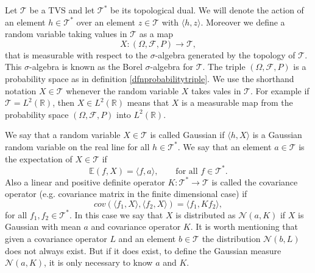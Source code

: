 \documentclass[12pt]{book}
\newcommand{\E}{\mathbb{E}} %
\newcommand{\tvs}{\mathscr{T}} %
\begin{document}
Let $\mathscr{T}$ be a TVS and  let $\mathscr{T}^{*}$ be its topological dual. 
We will denote the action of an 
element $h\in\tvs^{*}$ over an element $z\in\tvs$ with $\langle h,z\rangle$. Moreover 
we  define a random variable taking values in $\tvs$ as a map 
\begin{equation*}
X:(\Omega,\mathscr{F},P)\longrightarrow\tvs,
\end{equation*}
that is measurable with respect to the $\sigma$-algebra generated by the topology
of $\tvs$. This $\sigma$-algebra is known as the Borel $\sigma$-algebra for $\tvs$.
The triple $(\Omega,\mathscr{F},P)$ is a probability space as in definition \ref{dfnprobabilitytriple}. 
We use the shorthand notation  $X\in\tvs$ whenever the random variable $X$ takes vales in $\tvs$. 
For example if $\tvs=L^{2}(\mathbb{R})$,  then  $X\in L^{2}(\mathbb{R})$ means that $X$ is a measurable
map from the probability space $(\Omega,\mathscr{F},P)$ into $L^{2}(\mathbb{R})$.

We say that a random variable $X\in\tvs$ is called Gaussian if $\langle h,X\rangle$ is
a Gaussian random variable on the real line for all $h\in\tvs^{*}$. We say that an element $a\in\tvs$ is the 
expectation of $X\in\tvs$ if 
\begin{equation*}
\E(f,X)=\langle f, a\rangle,\qquad\text{for all }f\in\tvs^{*}.
\end{equation*}
Also a linear and positive definite operator $K:\tvs^{*}\longrightarrow \tvs$ 
is called the covariance operator (e.g. covariance
matrix in the finite dimensional case) if
\begin{equation*}
cov(\langle f_{1},X\rangle,\langle f_{2},X\rangle)=\langle f_{1},Kf_{2}\rangle,
\end{equation*}
for all $f_{1},f_{2}\in\tvs^{*}$. In this case we say that $X$ is distributed as 
$\mathcal{N}(a,K)$ if  $X$ is Gaussian with mean $a$ and covariance operator $K$. It is worth mentioning
that given a covariance operator $L$ and an element $b\in\tvs$ the distribution $\mathcal{N}(b,L)$
does not always exist. But if it does exist, to define the  Gaussian measure $\mathcal{N}(a,K)$, it is
only necessary to know $a$ and $K$.
\newline

\end{document}
